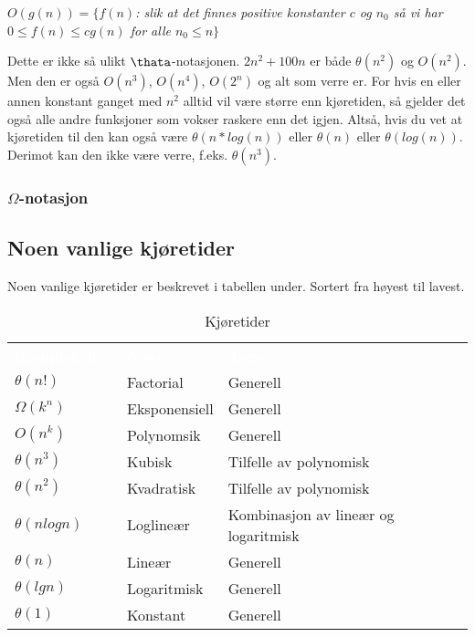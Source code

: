 \begin{center}
\textit{$O(g(n)) = \{ f(n)$: slik at det finnes positive konstanter $c$ og $n_0$ så vi har $0 \leq f(n) \leq cg(n)$ for alle $n_0 \leq n \}$}
\end{center}

\noindent Dette er ikke så ulikt $\thata$-notasjonen. $2n^2 + 100n$ er både $\theta(n^2)$ og $O(n^2)$. Men den er også $O(n^3)$, $O(n^4)$, $O(2^n)$ og alt som verre er. For hvis en eller annen konstant ganget med $n^2$ alltid vil være større enn kjøretiden, så gjelder det også alle andre funksjoner som vokser raskere enn det igjen. Altså, hvis du vet at kjøretiden til den kan også være $\theta(n*log(n))$ eller $\theta(n)$ eller $\theta(log(n))$. Derimot kan den ikke være verre, f.eks. $\theta(n^3)$.

\subsubsection{$\Omega$-notasjon}

\subsection{Noen vanlige kjøretider}
Noen vanlige kjøretider er beskrevet i tabellen under. Sortert fra høyest til lavest.

\begin{table}[H]
    \caption{Kjøretider}
    \label{tab:kjoretider}
    \centering
    \begin{tabular}{|L{15em} | L{15em}|L{15em}|}
        \hline
        \textbf{\textcolor{white}{Kompleksitet}} & \textbf{\textcolor{white}{Navn}} & \textbf{\textcolor{white}{Type}}\\
        $\theta(n!)$ & Factorial & Generell\\
        $\Omega(k^n)$ & Eksponensiell & Generell\\
        $O(n^k)$ & Polynomsik & Generell\\
        $\theta(n^3)$ & Kubisk & Tilfelle av polynomisk\\
        $\theta(n^2)$ & Kvadratisk & Tilfelle av polynomisk\\
        $\theta(n log n)$ & Loglineær & Kombinasjon av lineær og logaritmisk\\
        $\theta(n)$ & Lineær & Generell\\
        $\theta(lg n)$ & Logaritmisk & Generell\\
        $\theta(1)$ & Konstant & Generell\\
         \hline
    \end{tabular}
\end{table}


